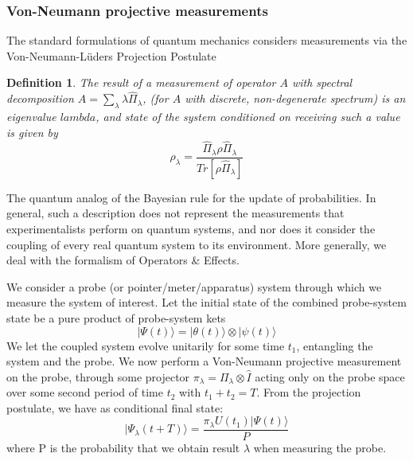 \subsubsection{Von-Neumann projective measurements}
The standard formulations of quantum mechanics considers measurements via the Von-Neumann-L\"uders Projection Postulate\cite{Dirac1927}
\newtheorem{definition}{Definition}
\begin{definition}
    The result of a measurement of operator $A$ with spectral decomposition $A = \sum_\lambda \lambda \hat{\Pi}_\lambda $, (for $A$ with discrete, non-degenerate spectrum) is an eigenvalue $lambda$, and state of the system conditioned on receiving such a value is given by 
    \begin{equation}
        \rho_\lambda = \frac{\hat{\Pi}_\lambda \rho \hat{\Pi}_\lambda}{Tr[\rho\hat{\Pi}_\lambda]}
    \end{equation}
\end{definition}
The quantum analog of the Bayesian rule for the update of probabilities. 
In general, such a description does not represent the measurements that experimentalists perform on quantum systems, and nor does it consider the coupling of every real quantum system to its environment. More generally, we deal with the formalism of Operators \& Effects.

We consider a probe (or pointer/meter/apparatus) system through which we measure the system of interest. Let the initial state of the combined probe-system state be a pure product of probe-system kets
\begin{equation}
  | \Psi (t) \rangle = | \theta (t) \rangle \otimes | \psi (t) \rangle
\end{equation}
We let the coupled system evolve unitarily for some time $t_1$, entangling the system and the probe. We now perform a Von-Neumann projective measurement on the probe, through some projector $\pi_\lambda = \Pi_\lambda \otimes \hat{I}$ acting only on the probe space over some second period of time $t_2$ with $t_1 + t_2 = T$. From the projection postulate, we have as conditional final state:
\begin{equation}
    | \Psi_\lambda (t+T) \rangle = \frac{\pi_\lambda U(t_1) |\Psi(t)\rangle}{P}
\end{equation}
where P is the probability that we obtain result $\lambda$ when measuring the probe. 

